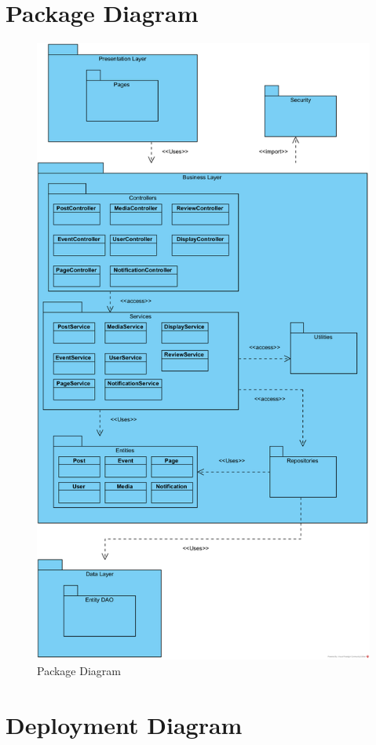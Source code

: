 \documentclass{article}
\begin{document}
\section{Package Diagram}

\begin{figure}[H]
    \centering
    \includegraphics[width=.64\textwidth]{images/Package_Diagram.png}
    \centering
    \caption{Package Diagram}
\end{figure}

\section{Deployment Diagram}
\end{document}
